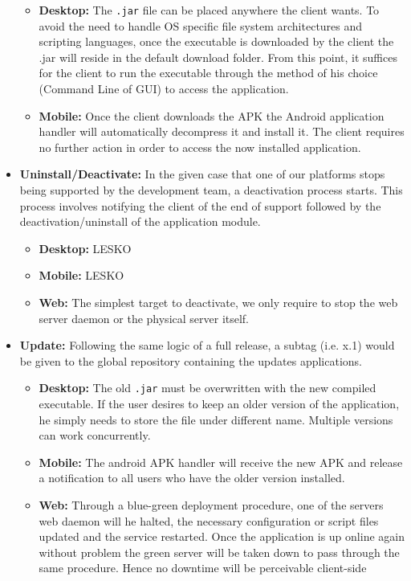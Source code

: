 \documentclass[12pt]{report}
\begin{document}
\begin{itemize}
    \begin{itemize}
        \item \textbf{Desktop:} The \texttt{.jar} file can be placed anywhere the client wants. To avoid the need to handle OS specific file system architectures and scripting languages, once the executable is downloaded by the client the .jar will reside in the default download folder. From this point, it suffices for the client to run the executable through the method of his choice (Command Line of GUI) to access the application.
        \item \textbf{Mobile:} Once the client downloads the APK the Android application handler will automatically decompress it and install it. The client requires no further action in order to access the now installed application.
    \end{itemize}
    \item \textbf{Uninstall/Deactivate:} In the given case that one of our platforms stops being supported by the development team, a deactivation process starts. This process involves notifying the client of the end of support followed by the deactivation/uninstall of the application module.
        \begin{itemize}
        \item \textbf{Desktop:} LESKO
        \item \textbf{Mobile:} LESKO
        \item \textbf{Web:} The simplest target to deactivate, we only require to stop the web server daemon or the physical server itself.
    \end{itemize}
    \item \textbf{Update:} Following the same logic of a full release, a subtag (i.e. x.1) would be given to the global repository containing the updates applications. 
    \begin{itemize}
        \item \textbf{Desktop:} The old \texttt{.jar} must be overwritten with the new compiled executable. If the user desires to keep an older version of the application, he simply needs to store the file under different name. Multiple versions can work concurrently.
        \item \textbf{Mobile:} The android APK handler will receive the new APK and release a notification to all users who have the older version installed.
        \item \textbf{Web:} Through a blue-green deployment procedure, one of the servers web daemon will he halted, the necessary configuration or script files updated and the service restarted. Once the application is up online again without problem the green server will be taken down to pass through the same procedure. Hence no downtime will be perceivable client-side

\end{itemize}
\end{itemize}
\end{document}
